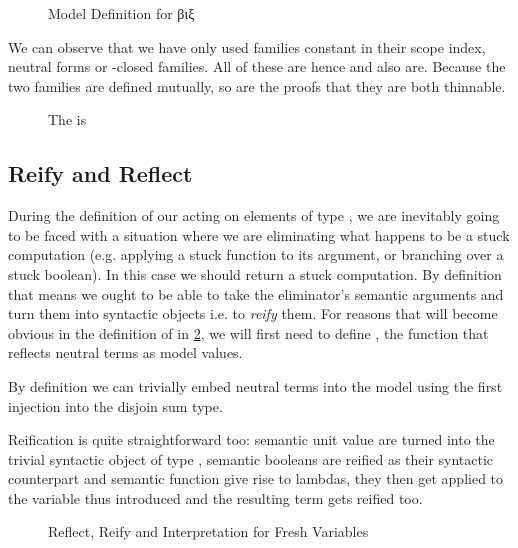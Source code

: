 \begin{figure}[h]
\caption{Model Definition for βιξ\label{nbestuckmodel}}
\end{figure}

We can observe that we have only used families constant in their scope
index, neutral forms or -closed families. All of these are
 hence  and  also are. Because the
two families are defined mutually, so are the proofs that they are both
thinnable.

\begin{figure}[h]
\caption{The  is }
\end{figure}

\subsection{Reify and Reflect}

During the definition of our  acting on elements of
type , we are inevitably going to be faced with a situation
where we are eliminating what happens to be a stuck computation
(e.g. applying a stuck function to its argument, or branching over
a stuck boolean).
%
In this case we should return a stuck computation. By definition
that means we ought to be able to take the eliminator's semantic
arguments and turn them into syntactic objects i.e. to \emph{reify}
them. For reasons that will become obvious in the definition of
 in \cref{fig:bix:reifyreflect}, we will first need to
define , the function that reflects neutral terms as
model values.

By definition we can trivially embed neutral terms into the model
using the first injection into the disjoin sum type.

Reification is quite straightforward too: semantic unit value are
turned into the trivial syntactic object of type ,
semantic booleans are reified as their syntactic counterpart and
semantic function give rise to lambdas, they then get applied to
the variable thus introduced and the resulting term gets reified too.

\begin{figure}[h]
\caption{Reflect, Reify and Interpretation for Fresh Variables}\label{fig:bix:reifyreflect}
\end{figure}

